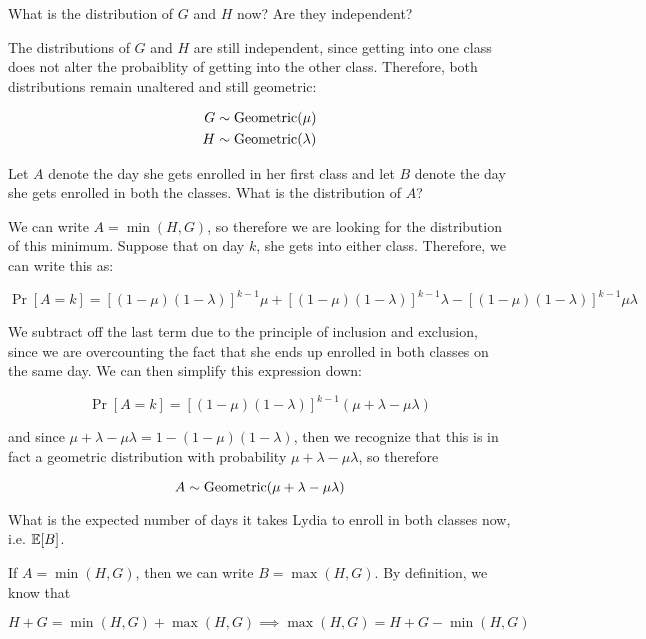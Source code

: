 \documentclass[11pt]{article}
\begin{document}
\begin{ResumeParts}
	\Part What is the distribution of $G$ and $H$ now? Are they independent?

	\begin{solution}
		The distributions of $G$ and $H$ are still independent, since getting into one class does not alter the probaiblity of getting into the other class. Therefore, both distributions remain unaltered and still geometric:

		\begin{align*}
			G &\sim \operatorname{Geometric}(\mu)\\
			H &\sim \operatorname{Geometric}(\lambda)
		\end{align*}
	\end{solution}

	\Part Let $A$ denote the day she gets enrolled in her first class and let $B$ denote the day she gets enrolled in both the classes.
	What is the distribution of $A$?

	\begin{solution}
		We can write $A = \min(H, G)$, so therefore we are looking for the distribution of this minimum. Suppose that on day $k$, she gets into either class. Therefore, we can write this as: 

		\[ \Pr[A = k] = \left[(1 - \mu)(1 - \lambda)\right]^{k-1} \mu + [(1 - \mu)(1 - \lambda)]^{k-1}\lambda - [(1 - \mu)(1 - \lambda)]^{k - 1} \mu \lambda\] 

		We subtract off the last term due to the principle of inclusion and exclusion, since we are overcounting the fact that she ends up enrolled in both classes on the same day. We can then simplify this expression down: 

		\[ \Pr[A = k] = [(1 - \mu)(1 - \lambda)]^{k -1}(\mu + \lambda - \mu \lambda) \]

		and since $\mu + \lambda - \mu \lambda = 1 - (1 - \mu)(1 - \lambda)$, then we recognize that this is in fact a geometric distribution with probability $\mu + \lambda - \mu \lambda$, so therefore 

		\[ A \sim \operatorname{Geometric}(\mu + \lambda - \mu \lambda)\]
	\end{solution}

	\Part What is the expected number of days it takes Lydia to enroll in both classes now, i.e. $\operatorname{\mathbb{E}}[B]$.

	\begin{solution}
		If $A = \min(H, G)$, then we can write $B = \max(H, G)$. By definition, we know that 

		\[ H + G = \min(H, G) + \max(H, G) \implies \max(H, G) = H + G - \min(H, G)\]


\end{solution}
\end{ResumeParts}
\end{document}
